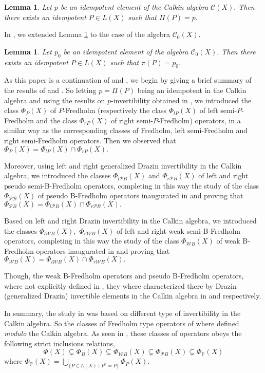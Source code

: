 \documentclass[10pt]{article}
\newcommand{\blm}{\begin{lemma}}
\newcommand{\elm}{\end{lemma}}
\newtheorem{lemma}[theorem]{Lemma}
\numberwithin{equation}{section}
\begin{document}
 \blm \cite[Lemma 1]{BAR} \label{Barnes}
Let $p$ be an idempotent element of the Calkin algebra $ \mathcal{C}(X).$  Then there exists
an idempotent $P \in L(X)$ such that $ \Pi(P)= p.$
\elm
 
  In \cite[Theorem 2.1]{HB2}, we extended Lemma \ref{Barnes} to the case of the algebra $ \mathcal{C}_0(X).$  
 
 \blm \label{idempotent} \cite[Theorem 2.1]{HB2}
Let $p_0$ be an idempotent element of the algebra $ \mathcal{C}_0(X).$  Then there exists
an idempotent $P \in L(X)$ such that $ \pi(P)= p_0.$
\elm
 As this paper is a continuation of \cite{HB1} and \cite{HB2}, we begin by giving a brief  summary of the results of \cite{HB1} and \cite{HB2}. So letting $p=\Pi(P)$ being  an idempotent  in the Calkin algebra and    using the results on $p$-invertibility obtained  in  \cite{P50},   we introduced  the class $\Phi_P(X)$ of $P$-Fredholm (respectively the class $\Phi_{lP}(X)$ of left semi-$P$-Fredholm and the class $\Phi_{rP}(X)$ of right  semi-$P$-Fredholm)  operators, in a similar way as  the corresponding classes of Fredholm, left semi-Fredholm and right semi-Fredholm operators. Then we observed that
$\Phi_P(X)= \Phi_{lP}(X)\cap \Phi_{rP}(X).$

 Moreover, using left and right generalized Drazin invertibility in the Calkin algebra, we  introduced the classes $\Phi_{l\mathcal{P}B}(X) $ and $\Phi_{r\mathcal{P}B}(X) $ of left and right  pseudo semi-B-Fredholm operators, completing in this way the study of the class  $\Phi_{\mathcal{PB}}(X) $ of pseudo B-Fredholm operators inaugurated  in \cite{P45} and  proving that   $\Phi_{\mathcal{P}B}(X)= \Phi_{l\mathcal{P}B}(X)\cap \Phi_{r\mathcal{P}B}(X).$

 Based on left and right  Drazin invertibility in the Calkin algebra, we
 introduced  the classes $\Phi_{l\mathcal{W}B}(X),$  $\Phi_{r\mathcal{W}B}(X) $  of  left and right  weak semi-B-Fredholm operators, completing in this way the study of the class  $\Phi_{\mathcal{W}B}(X) $ of weak B-Fredholm operators inaugurated  in \cite{P45} and proving that  $\Phi_{\mathcal{W}B}(X)= \Phi_{l\mathcal{W}B}(X)\cap \Phi_{r\mathcal{W}B}(X).$

Though, the weak B-Fredholm operators and  pseudo B-Fredholm  operators, where not  explicitly defined in \cite{BO}, they where characterized there  by  Drazin (generalized Drazin) invertible elements in the Calkin algebra in \cite[Theorem 6.1,ii]{BO}  and  \cite[Theorem 6.1, i]{BO} respectively.


 In summary, the study in \cite{HB1} was based on different type of invertibility in the Calkin algebra.  So  the classes of  Fredholm type operators of \cite{HB1} where defined   \textit{modulo} the Calkin algebra.  As seen in \cite{HB1},  these classes of operators obeys   the following strict inclusions relations, $$ \Phi(X) \subsetneq \Phi_B(X) \subsetneq \Phi_{\mathcal{W}B}(X) \subsetneq \Phi_{\mathcal{P}B}(X)\subsetneq \Phi_\mathbb{P}(X)$$  where  $ \Phi_{\mathbb{P}}(X)=\bigcup\limits_{ \{ P\in L(X) \mid P^2=P\}}\Phi_P(X). $
\end{document}
